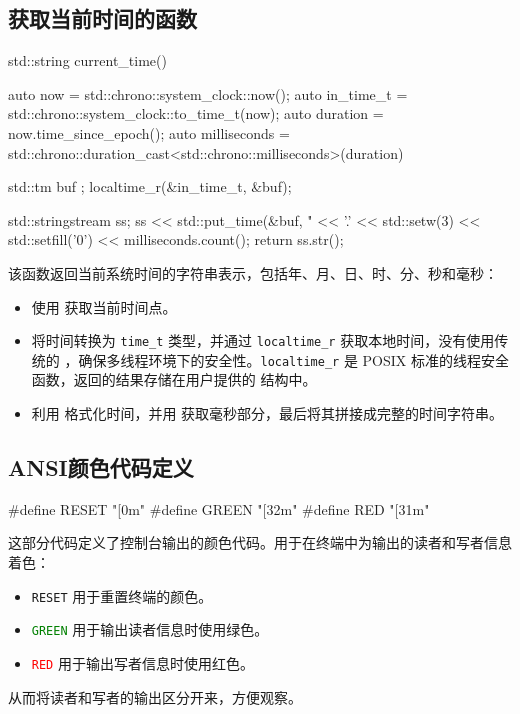 \subsection{获取当前时间的函数}
\begin{cppcode}
std::string current_time()
{
    auto now = std::chrono::system_clock::now();
    auto in_time_t = std::chrono::system_clock::to_time_t(now);
    auto duration = now.time_since_epoch();
    auto milliseconds = std::chrono::duration_cast<std::chrono::milliseconds>(duration) %

    std::tm buf {};
    localtime_r(&in_time_t, &buf);

    std::stringstream ss;
    ss << std::put_time(&buf, "%
       << '.' << std::setw(3) << std::setfill('0') << milliseconds.count();
    return ss.str();
}
\end{cppcode}
该函数返回当前系统时间的字符串表示，包括年、月、日、时、分、秒和毫秒：
\begin{itemize}
    \item 使用  获取当前时间点。
    \item 将时间转换为 \texttt{time\_t} 类型，并通过 \texttt{localtime\_r} 获取本地时间，没有使用传统的 ，确保多线程环境下的安全性。\texttt{localtime\_r} 是 POSIX 标准的线程安全函数，返回的结果存储在用户提供的  结构中。
    \item 利用  格式化时间，并用  获取毫秒部分，最后将其拼接成完整的时间字符串。
\end{itemize}

\subsection{ANSI颜色代码定义}
\begin{cppcode}
#define RESET "[0m"
#define GREEN "[32m"
#define RED "[31m"
\end{cppcode}
这部分代码定义了控制台输出的颜色代码。用于在终端中为输出的读者和写者信息着色：\begin{itemize}
    \item \texttt{RESET} 用于重置终端的颜色。
    \item \textcolor{green}{\texttt{GREEN}} 用于输出读者信息时使用绿色。
	\item \textcolor{red}{\texttt{RED}} 用于输出写者信息时使用红色。
\end{itemize}
从而将读者和写者的输出区分开来，方便观察。

